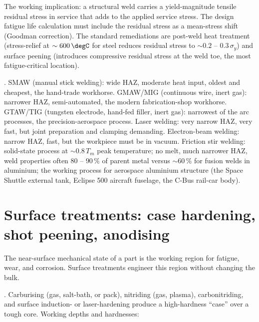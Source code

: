 The working implication: a structural weld carries a yield-magnitude
tensile residual stress in service that adds to the applied service
stress. The design fatigue life calculation must include the residual
stress as a mean-stress shift (Goodman correction). The standard
remediations are post-weld heat treatment (stress-relief at $\sim
600\,\degC$ for steel reduces residual stress to $\sim 0.2$ -- $0.3\,
\sigma_y$) and surface peening (introduces compressive residual stress
at the weld toe, the most fatigue-critical location).

. SMAW (manual stick
welding): wide HAZ, moderate heat input, oldest and cheapest, the
hand-trade workhorse. GMAW/MIG (continuous wire, inert gas): narrower
HAZ, semi-automated, the modern fabrication-shop workhorse. GTAW/TIG
(tungsten electrode, hand-fed filler, inert gas): narrowest of the
arc processes, the precision-aerospace process. Laser welding: very
narrow HAZ, very fast, but joint preparation and clamping demanding.
Electron-beam welding: narrow HAZ, fast, but the workpiece must be
in vacuum. Friction stir welding: solid-state process at $\sim
0.8\,T_m$ peak temperature; no melt, much narrower HAZ, weld
properties often $80$ -- $90\,\%$ of parent metal versus $\sim 60\,\%$
for fusion welds in aluminium; the working process for aerospace
aluminium structure (the Space Shuttle external tank, Eclipse 500
aircraft fuselage, the C-Bus rail-car body).

\section{Surface treatments: case hardening, shot peening, anodising}

The near-surface mechanical state of a part is the working region for
fatigue, wear, and corrosion. Surface treatments engineer this region
without changing the bulk.

. Carburising (gas, salt-bath, or
pack), nitriding (gas, plasma), carbonitriding, and surface induction-
or laser-hardening produce a high-hardness ``case'' over a tough
core. Working depths and hardnesses:


